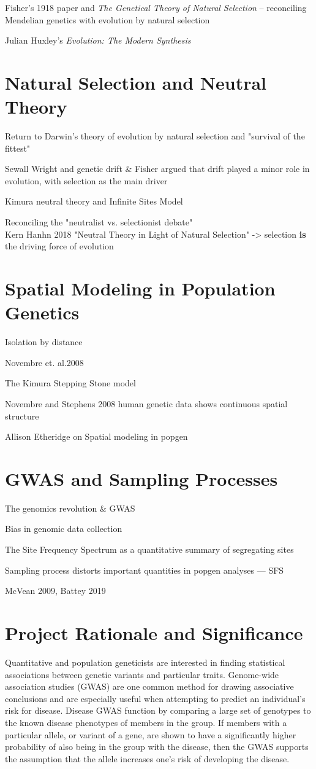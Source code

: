 Fisher's 1918 paper and \textit{The Genetical Theory of Natural Selection} -- reconciling Mendelian genetics with evolution by natural selection


Julian Huxley's \textit{Evolution: The Modern Synthesis}


\section{Natural Selection and Neutral Theory}
Return to Darwin's theory of evolution by natural selection and "survival of the fittest"  


Sewall Wright and genetic drift & Fisher argued that drift played a minor role in evolution, with selection as the main driver


Kimura neutral theory and Infinite Sites Model


Reconciling the "neutralist vs. selectionist debate"
\\
Kern Hanhn 2018 "Neutral Theory in Light of Natural Selection" -> selection \textbf{is} the driving force of evolution

\section{Spatial Modeling in Population Genetics}
Isolation by distance


Novembre et. al.2008


The Kimura Stepping Stone model  


Novembre and Stephens 2008 human genetic data shows continuous spatial structure 


Allison Etheridge on Spatial modeling in popgen 

\section{GWAS and Sampling Processes}
The genomics revolution & GWAS


Bias in genomic data collection


The Site Frequency Spectrum as a quantitative summary of segregating sites 


Sampling process distorts important quantities in popgen analyses --- SFS

McVean 2009, Battey 2019 

\newpage
\section{Project Rationale and Significance}
Quantitative and population geneticists are interested in finding statistical associations between genetic variants and particular traits. Genome-wide association studies (GWAS) are one common method for drawing associative conclusions and are especially useful when attempting to predict an individual’s risk for disease. Disease GWAS function by comparing a large set of genotypes to the known disease phenotypes of members in the group. If members with a particular allele, or variant of a gene, are shown to have a significantly higher probability of also being in the group with the disease, then the GWAS supports the assumption that the allele increases one’s risk of developing the disease.	


